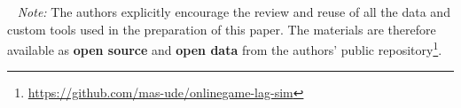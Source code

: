 ~\newline
\textit{Note:} The authors explicitly encourage the review and reuse of all the data and custom tools used in the preparation of this paper. The materials are therefore available as \textbf{open source} and \textbf{open data} from the authors' public repository\footnote{\url{https://github.com/mas-ude/onlinegame-lag-sim}}.














